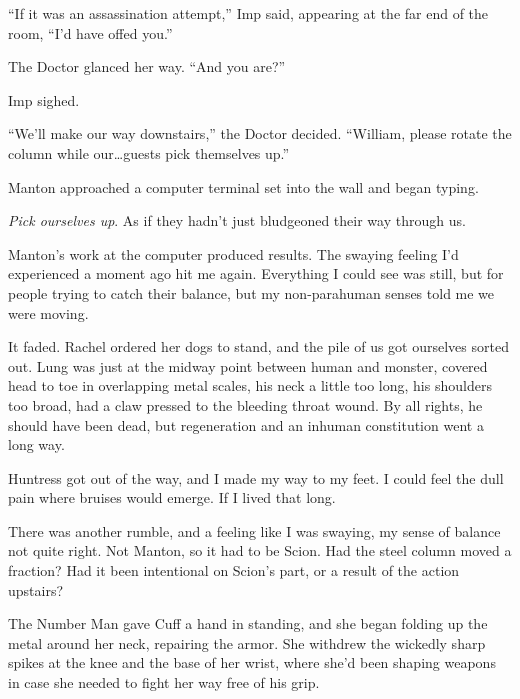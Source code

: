 ``If it was an assassination attempt,'' Imp said, appearing at the far end of the room, ``I'd have offed you.''



The Doctor glanced her way.  ``And you are?''



Imp sighed.



``We'll make our way downstairs,'' the Doctor decided.  ``William, please rotate the column while our\ldots guests pick themselves up.''



Manton approached a computer terminal set into the wall and began typing.



\emph{Pick ourselves up}.  As if they hadn't just bludgeoned their way through us.



Manton's work at the computer produced results.  The swaying feeling I'd experienced a moment ago hit me again.  Everything I could see was still, but for people trying to catch their balance, but my non-parahuman senses told me we were moving.



It faded.  Rachel ordered her dogs to stand, and the pile of us got ourselves sorted out.  Lung was just at the midway point between human and monster, covered head to toe in overlapping metal scales, his neck a little too long, his shoulders too broad, had a claw pressed to the bleeding throat wound.  By all rights, he should have been dead, but regeneration and an inhuman constitution went a long way.



Huntress got out of the way, and I made my way to my feet.  I could feel the dull pain where bruises would emerge.  If I lived that long.



There was another rumble, and a feeling like I was swaying, my sense of balance not quite right.  Not Manton, so it had to be Scion.  Had the steel column moved a fraction?  Had it been intentional on Scion's part, or a result of the action upstairs?



The Number Man gave Cuff a hand in standing, and she began folding up the metal around her neck, repairing the armor.  She withdrew the wickedly sharp spikes at the knee and the base of her wrist, where she'd been shaping weapons in case she needed to fight her way free of his grip.



